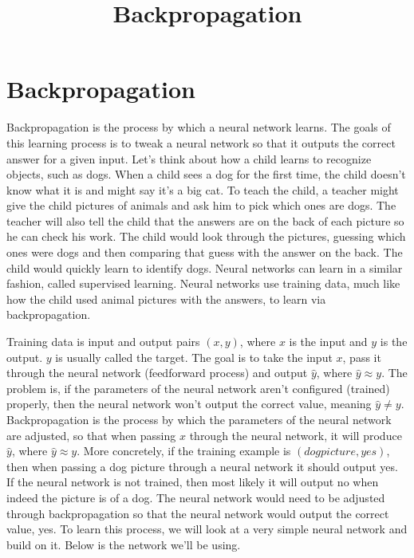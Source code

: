 \documentclass[11pt]{article}
\title{Backpropagation}
\begin{document}
    
    
    \maketitle
    
    

    
    \hypertarget{backpropagation}{%
\section{Backpropagation}\label{backpropagation}}

    Backpropagation is the process by which a neural network learns. The
goals of this learning process is to tweak a neural network so that it
outputs the correct answer for a given input. Let's think about how a
child learns to recognize objects, such as dogs. When a child sees a dog
for the first time, the child doesn't know what it is and might say it's
a big cat. To teach the child, a teacher might give the child pictures
of animals and ask him to pick which ones are dogs. The teacher will
also tell the child that the answers are on the back of each picture so
he can check his work. The child would look through the pictures,
guessing which ones were dogs and then comparing that guess with the
answer on the back. The child would quickly learn to identify dogs.
Neural networks can learn in a similar fashion, called supervised
learning. Neural networks use training data, much like how the child
used animal pictures with the answers, to learn via backpropagation.

Training data is input and output pairs \((x,y)\), where \(x\) is the
input and \(y\) is the output. \(y\) is usually called the target. The
goal is to take the input \(x\), pass it through the neural network
(feedforward process) and output \(\hat{y}\), where
\(\hat{y} \approx y\). The problem is, if the parameters of the neural
network aren't configured (trained) properly, then the neural network
won't output the correct value, meaning \(\hat{y} \neq y\).
Backpropagation is the process by which the parameters of the neural
network are adjusted, so that when passing \(x\) through the neural
network, it will produce \(\hat{y}\), where \(\hat{y} \approx y\). More
concretely, if the training example is \((dog picture, yes)\), then when
passing a dog picture through a neural network it should output yes. If
the neural network is not trained, then most likely it will output no
when indeed the picture is of a dog. The neural network would need to be
adjusted through backpropagation so that the neural network would output
the correct value, yes. To learn this process, we will look at a very
simple neural network and build on it. Below is the network we'll be
using.
\end{document}
